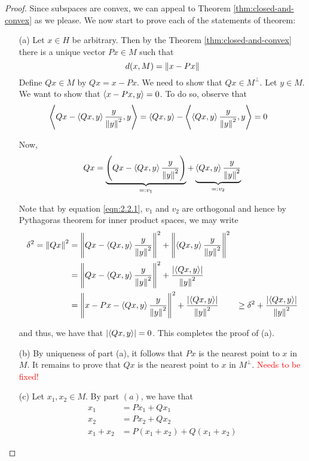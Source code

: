\begin{proof}
    Since subspaces are convex, we can appeal to Theorem \ref{thm:closed-and-convex} as we please. We now start to prove each of the statements of theorem:
    \begin{itemize}
	\item [(a)] Let $x \in H$ be arbitrary. Then by the Theorem \ref{thm:closed-and-convex} there is a unique vector $Px \in M$ such that 
	    \begin{equation*}
		d(x, M) = \left\lVert x-Px \right\rVert
	    \end{equation*}
	    Define $Qx \in M$ by $Qx = x-Px$. We need to show that $Qx \in M^{\perp}$. Let $y \in M$. We want to show that $\left\langle x-Px , y \right\rangle = 0$. To do so, observe that
	    \begin{align}
		\left\langle Qx - \left\langle Qx,y \right\rangle \frac{y}{\left\lVert y \right\rVert^{2}},y \right\rangle&= \left\langle Qx,y \right\rangle - \left\langle \left\langle Qx,y \right\rangle \frac{y}{\left\lVert y \right\rVert^{2}},y \right\rangle
		=0
		\label{eqn:2.2.1}
	    \end{align}

	    Now, 
	    \begin{align*}
		Qx = \underbrace{\left( Qx - \left\langle Qx, y \right\rangle \frac{y}{\left\lVert y \right\rVert^{2}} \right)}_{=: v_1} + \underbrace{\left\langle Qx,y \right\rangle \frac{y}{\left\lVert y \right\rVert^{2}}}_{=:v_2}
	    \end{align*}

	    Note that by equation \ref{eqn:2.2.1}, $v_1$ and $v_2$ are orthogonal and hence by Pythagoras theorem for inner product spaces, we may write
\begin{align*}
    \delta ^{2} = \left\lVert Qx \right\rVert^{2} &= \left\lVert  Qx - \left\langle Qx, y \right\rangle \frac{y}{\left\lVert y \right\rVert^{2}} \right\rVert^{2} + \left\lVert \left\langle Qx,y \right\rangle \frac{y}{\left\lVert y \right\rVert^{2}} \right\rVert^{2} \\
    &= \left\lVert  Qx - \left\langle Qx, y \right\rangle \frac{y}{\left\lVert y \right\rVert^{2}} \right\rVert^{2} + \frac{\left\lvert \left\langle Qx,y \right\rangle \right\rvert}{\left\lVert y \right\rVert^{2}} \\
    &= \left\lVert  x- Px - \left\langle Qx, y \right\rangle \frac{y}{\left\lVert y \right\rVert^{2}} \right\rVert^{2} + \frac{\left\lvert \left\langle Qx,y \right\rangle \right\rvert}{\left\lVert y \right\rVert^{2}}
    &\ge \delta ^{2} +  \frac{\left\lvert \left\langle Qx,y \right\rangle \right\rvert}{\left\lVert y \right\rVert^{2}}
	    \end{align*}

	    and thus, we have that $\left\lvert \left\langle Qx,y \right\rangle \right\rvert = 0$. This completes the proof of (a).
	\item [(b)] By uniqueness of part (a), it follows that $Px$ is the nearest point to $x$ in $M$. It remains to prove that $Qx$ is the nearest point to $x$ in $M^{\perp}$. \textcolor{red}{Needs to be fixed!}

	\item [(c)] Let $x_{1}, x_{2} \in M$. By part $(a)$, we have that 
	    \begin{align*}
		x_{1} &= Px_{1} + Qx_{1} \\
		x_{2} &= Px_{2} + Qx_{2} \\
		x_{1} + x_{2} &= P\left( x_{1} + x_{2} \right) + Q \left( x_{1} + x_{2} \right)
	    \end{align*}


\end{itemize}
\end{proof}
